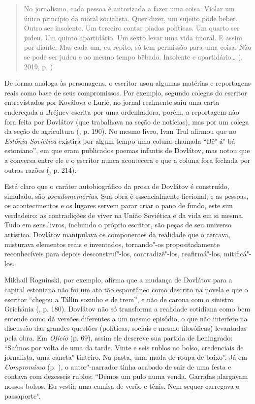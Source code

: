 \begin{quote}
No jornalismo, cada pessoa é autorizada a fazer uma coisa. Violar um
único princípio da moral socialista. Quer dizer, um sujeito pode beber.
Outro ser insolente. Um terceiro contar piadas políticas. Um quarto ser
judeu. Um quinto apartidário. Um sexto levar uma vida imoral. E assim
por diante. Mas cada um, eu repito, só tem permissão para uma coisa. Não
se pode ser judeu e ao mesmo tempo bêbado. Insolente e apartidário\ldots{}
(, 2019, p. \pageref{ref2})
\end{quote}

De forma análoga às personagens, o escritor usou algumas matérias e
reportagens reais como base de seus compromissos. Por exemplo, segundo
colegas do escritor entrevistados por Koválova e Lurié, no jornal
realmente saiu uma carta endereçada a Bréjnev escrita por uma
ordenhadora, porém, a reportagem não fora feita por Dovlátov (que
trabalhava na seção de notícias), mas por um colega da seção de
agricultura (, p. 190). No mesmo livro, Ivan Trul afirmou que no
\emph{Estônia Soviética} existira por algum tempo uma coluna chamada
``Bê"-á"-bá estoniano'', em que eram publicados poemas infantis de
Dovlátov, mas notou que a conversa entre ele e o escritor nunca
acontecera e que a coluna fora fechada por outras razões (, p.
214).

Está claro que o caráter autobiográfico da prosa de Dovlátov é
construído, simulado, são \emph{pseudomemórias}. Sua obra é
essencialmente ficcional, e as pessoas, os acontecimentos e os lugares
servem parar criar o pano de fundo, este sim verdadeiro: as contradições
de viver na União Soviética e da vida em si mesma. Tudo em seus livros,
incluindo o próprio escritor, são peças de seu universo artístico.
Dovlátov manipulava os componentes da realidade que o cercava, misturava
elementos reais e inventados, tornando"-os propositadamente reconhecíveis
para depois desconstruí"-los, contradizê"-los, reafirmá"-los, mitificá"-los.

Mikhail Roguínski, por exemplo, afirma que a mudança de Dovlátov para a
capital estoniana não foi um ato tão espontâneo como descrito na novela
e que o escritor ``chegou a Tállin sozinho e de trem'', e não de carona
com o sinistro Grichánia (, p. 180). Dovlátov não só transforma
a realidade cotidiana como bem entende como dá versões diferentes a um
mesmo episódio, o que não interfere na discussão das grandes questões
(políticas, sociais e mesmo filosóficas) levantadas pela obra. Em
\emph{Ofício} (p. 69), assim ele descreve sua partida de Leningrado:
``Saímos por volta de uma da tarde. Vinte e seis rublos no bolso,
credenciais de jornalista, uma caneta"-tinteiro. Na pasta, uma muda de
roupa de baixo''. Já em \emph{Compromisso} (p. \pageref{ref3}), o
autor"-narrador tinha acabado de sair de uma festa e contava com
dezesseis rublos: ``Demos um pulo numa venda. Garrafas alargavam nossos
bolsos. Eu vestia uma camisa de verão e tênis. Nem sequer carregava o
passaporte''.

